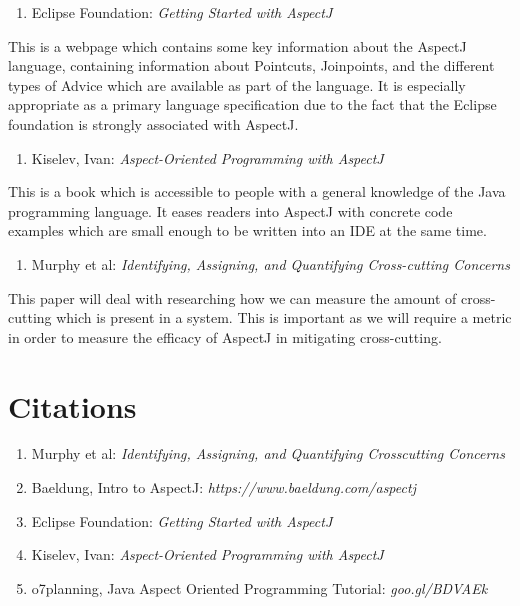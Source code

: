 \documentclass[sigconf]{acmart}
\begin{document}
\begin{enumerate}
    \item Eclipse Foundation: \textit{Getting Started with AspectJ}
\end{enumerate}
This is a webpage which contains some key information about the AspectJ language, containing information about Pointcuts, Joinpoints, and the different types of Advice which are available as part of the language. It is especially appropriate as a primary language specification due to the fact that the Eclipse foundation is strongly associated with AspectJ.

\begin{enumerate}
    \item Kiselev, Ivan: \textit{Aspect-Oriented Programming with AspectJ}
\end{enumerate}
This is a book which is accessible to people with a general knowledge of the Java programming language. It eases readers into AspectJ with concrete code examples which are small enough to be written into an IDE at the same time.

\begin{enumerate}
    \item Murphy et al: \textit{Identifying, Assigning, and Quantifying Cross-cutting Concerns}
\end{enumerate}
This paper will deal with researching how we can measure the amount of cross-cutting which is present in a system. This is important as we will require a metric in order to measure the efficacy of AspectJ in mitigating cross-cutting.

\section{Citations}
\begin{enumerate}
    \item Murphy et al: \textit{Identifying, Assigning, and Quantifying Crosscutting Concerns}
    \item Baeldung, Intro to AspectJ: \textit{https://www.baeldung.com/aspectj}
    \item Eclipse Foundation: \textit{Getting Started with AspectJ}
    \item Kiselev, Ivan: \textit{Aspect-Oriented Programming with AspectJ}
    \item o7planning, Java Aspect Oriented Programming Tutorial: \textit{goo.gl/BDVAEk}
\end{enumerate}
\end{document}
